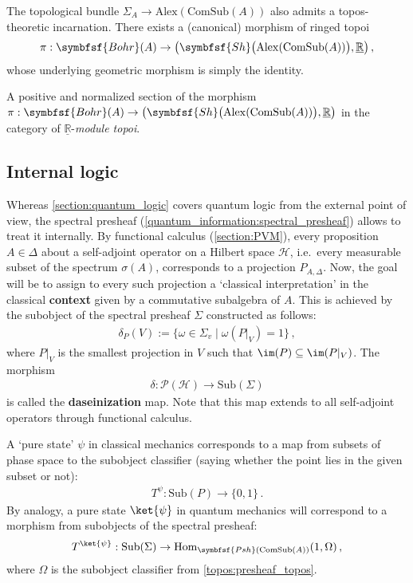     The topological bundle $\Sigma_A\rightarrow\mathrm{Alex}(\mathrm{ComSub}(A))$ also admits a topos-theoretic incarnation. There exists a (canonical) morphism of ringed topoi
    \begin{gather}
        \pi:\symbfsf{Bohr}(A)\rightarrow\bigl(\symbfsf{Sh}\bigl(\mathrm{Alex}(\mathrm{ComSub}(A))\bigr),\underline{\mathbb{R}}\bigr)\,,
    \end{gather}
    whose underlying geometric morphism is simply the identity.

    \begin{property}[States]
        A positive and normalized section of the morphism $\pi:\symbfsf{Bohr}(A)\rightarrow\bigl(\symbfsf{Sh}\bigl(\mathrm{Alex}(\mathrm{ComSub}(A))\bigr),\underline{\mathbb{R}}\bigr)$ in the category of $\underline{\mathbb{R}}$-\textit{module topoi}.
    \end{property}

\subsection{Internal logic}

    Whereas \cref{section:quantum_logic} covers quantum logic from the external point of view, the spectral presheaf (\cref{quantum_information:spectral_presheaf}) allows to treat it internally. By functional calculus (\cref{section:PVM}), every proposition $A\in\Delta$ about a self-adjoint operator on a Hilbert space $\mathcal{H}$, i.e.~every measurable subset of the spectrum $\sigma(A)$, corresponds to a projection $P_{A,\Delta}$. Now, the goal will be to assign to every such projection a `classical interpretation' in the classical \textbf{context} given by a commutative subalgebra of $A$. This is achieved by the subobject of the spectral presheaf $\Sigma$ constructed as follows:
    \begin{gather*}
        \delta_P(V) := \{\omega\in\Sigma_v\mid\omega(P|_V)=1\}\,,
    \end{gather*}
    where $P|_V$ is the smallest projection in $V$ such that $\im(P)\subseteq\im(P|_V)$. The morphism
    \begin{gather*}
        \delta:\mathcal{P}(\mathcal{H})\rightarrow\mathrm{Sub}(\Sigma)
    \end{gather*}
    is called the \textbf{daseinization} map. Note that this map extends to all self-adjoint operators through functional calculus.

    A `pure state' $\psi$ in classical mechanics corresponds to a map from subsets of phase space to the subobject classifier (saying whether the point lies in the given subset or not):
    \begin{gather*}
        T^\psi:\mathrm{Sub}(P)\rightarrow\{0,1\}\,.
    \end{gather*}
    By analogy, a pure state $\ket{\psi}$ in quantum mechanics will correspond to a morphism from subobjects of the spectral presheaf:
    \begin{gather*}
        T^{\ket{\psi}}:\mathrm{Sub}(\Sigma)\rightarrow\mathrm{Hom}_{\symbfsf{Psh}(\mathrm{ComSub}(A))}(1,\Omega)\,,
    \end{gather*}
    where $\Omega$ is the subobject classifier from \cref{topos:presheaf_topos}.